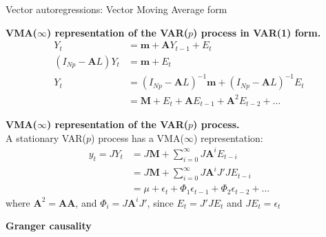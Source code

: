 \documentclass[notes,blackandwhite,mathsans,usenames,dvipsnames]{beamer}
\begin{document}
\begin{frame}{Vector autoregressions: Vector Moving Average form}
\small

\textbf{VMA($\infty$) representation of the VAR($p$) process in VAR(1) form.}
\begin{align*}
Y_t &= \mathbf{m} + \mathbf{A} Y_{t-1} + E_t\\
(I_{Np}-\mathbf{A}L)Y_t &= \mathbf{m} + E_t\\
Y_t &= (I_{Np}-\mathbf{A}L)^{-1}\mathbf{m} + (I_{Np}-\mathbf{A}L)^{-1}E_t\\
&= \mathbf{M} + E_t + \mathbf{A}E_{t-1}+ \mathbf{A}^2E_{t-2}+\dots
\end{align*}

\smallskip\textbf{VMA($\infty$) representation of the VAR($p$) process.}\\
{\color{mcxs2}A} {\color{mcxs1}stationary} VAR($p$) {\color{mcxs2}process has a} VMA($\infty$) {\color{mcxs2}representation:}
\begin{align*} 
y_t = JY_t &= J\mathbf{M} + \sum_{i=0}^{\infty}J\mathbf{A}^iE_{t-i} \\
&= J\mathbf{M} + \sum_{i=0}^{\infty}J\mathbf{A}^iJ'JE_{t-i}\\
& = \mu + \epsilon_{t} + \Phi_1 \epsilon_{t-1} + \Phi_2 \epsilon_{t-2} + \dots
\end{align*}
{\color{mcxs2}where} $\mathbf{A}^2=\mathbf{A}\mathbf{A}${\color{mcxs2}, and } $\Phi_i = J \mathbf{A}^{i}J'${\color{mcxs2}, since} $E_t = J'J E_t$ and $JE_t = \epsilon_t$
\end{frame}












{
\begin{frame}

\begin{adjustwidth}{-0.5cm}{0cm}
\vspace{8.3cm}\Large
\textbf{{\color{mcxs1}Granger} {\color{mcxs2}causality}}
\end{adjustwidth}

\end{frame}
}
\end{document}
